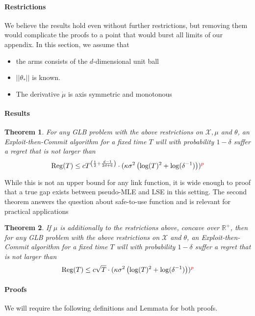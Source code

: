 \documentclass[twoside]{article} \usepackage{aistats2017}
\newtheorem{theorem}{Theorem}
\begin{document}
\paragraph{Restrictions}
We believe the results hold even without further restrictions, but removing them would complicate the proofs to a point that would burst all limits of our appendix.
In this section, we assume that
\begin{itemize}
\item the arms consists of the $d$-dimensional unit ball
\item $||\theta_*||$ is known.
\item The derivative $\dot{\mu}$ is axis symmetric and monotonous
\end{itemize}
\paragraph{Results} 
\begin{theorem}
For any GLB problem with the above restrictions on $\mathcal{X}, \mu$ and $\theta$, an Exploit-then-Commit algorithm for a fixed time $T$ will with probability $1-\delta$ suffer a regret that is not larger than 
$$
\operatorname{Reg}(T) \leq c T^{\left(\frac{1}{2}+\frac{d-1}{2d+6}\right)}\cdot(\kappa\sigma^2\left(\log(T)^2+\log(\delta^{-1})\right))\color{red}^p\color{black}
$$
\end{theorem}
While this is not an upper bound for any link function, it is wide enough to proof that a true gap exists between pseudo-MLE and LSE in this setting. The second theorem answers the question about safe-to-use function and is relevant for practical applications
\begin{theorem}
If $\mu$ is additionally to the restrictions above, concave over $\mathbb{R}^+$, then for any GLB problem with the above restrictions on $\mathcal{X}$ and $\theta$, an Exploit-then-Commit algorithm for a fixed time $T$ will with probability $1-\delta$ suffer a regret that is not larger than 
$$
\operatorname{Reg}(T) \leq c \sqrt{T}\cdot(\kappa\sigma^2\left(\log(T)^2+\log(\delta^{-1})\right))\color{red}^p\color{black}
$$
\end{theorem}
\paragraph{Proofs} We will require the following definitions and Lemmata for both proofs.
\end{document}
